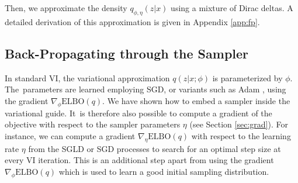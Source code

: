 Then, we approximate the density $q_{\phi,\eta}(z|x)$ using a mixture of Dirac deltas. A detailed derivation of this approximation is given in Appendix \ref{app:fp}. 


\subsection{Back-Propagating through the Sampler}\label{sec:tuning}

In standard VI, the variational approximation $q(z|x;\phi)$ is parameterized by $\phi$. The~parameters are learned employing SGD, or variants such as Adam \cite{kingma2014adam}, using the gradient $\nabla_{\phi} \mbox{ELBO}(q)$. We have shown how to embed a sampler inside the variational guide. 
It~is therefore also possible to compute a gradient of the objective with respect to the sampler parameters $\eta$ (see Section \ref{sec:grad}). For instance, we can compute a gradient
$\nabla_{\eta} \mbox{ELBO}(q)$
with respect to the learning rate $\eta$ from the SGLD or SGD processes to search for an optimal step size at every VI iteration. This is an additional step apart from using the gradient $\nabla_{\phi} \mbox{ELBO}(q)$ which is used to learn a good initial sampling distribution.


